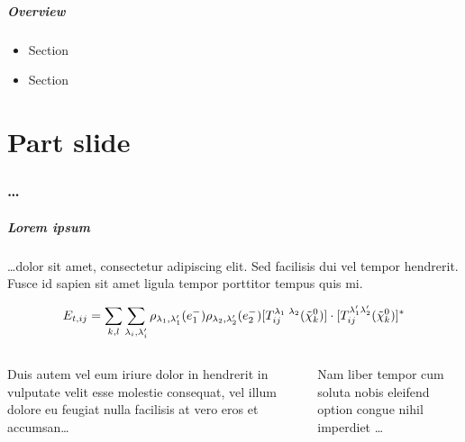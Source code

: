 \begin{frame}
\frametitle{Overview}
  \begin{itemize}[<+->]
      \item {Section}
      \item {Section}
  \end{itemize}
\end{frame}

\part[Part slide]{Part slide}
\makepart%

\section{\ldots}

\begin{frame}[t,label=...]
\frametitle{Lorem ipsum}
\ldots dolor sit amet, consectetur adipiscing elit. Sed facilisis
dui vel tempor hendrerit. Fusce id sapien sit amet ligula tempor
porttitor tempus quis mi.

\[
    E_{t,ij} = \sum_{k,l} \sum_{\lambda_i, \lambda_i'}
        \rho_{\lambda_1,\lambda_1'}(e^-_1)
        \rho_{\lambda_2,\lambda_2'}(e^-_2)
        [T_{ij}^{\lambda_1\phantom{'} \lambda_2}(\tilde{\chi}^0_k)]
        \cdot
        [T_{ij}^{\lambda_1' \lambda_2'}(\tilde{\chi}^0_k)]^*
\]

\begin{columns}
    \begin{column}[t]{0.48\textwidth}
    Duis autem vel eum iriure dolor in hendrerit in vulputate velit
    esse molestie consequat, vel illum dolore eu feugiat nulla
    facilisis at vero eros et accumsan\ldots
    \end{column}
    \begin{column}[t]{0.48\textwidth}
    Nam liber tempor cum soluta nobis eleifend option congue nihil
    imperdiet \ldots
    \end{column}
\end{columns}
\end{frame}


